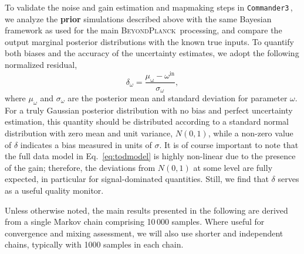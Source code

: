 \documentclass[twocolumn]{aa}%
\def\commanderthree{\texttt{Commander3}}
\newcommand{\BP}{\textsc{BeyondPlanck}}
\begin{document}
To validate the noise and gain estimation and mapmaking steps in
\commanderthree\,, we analyze the {\bf prior} simulations described
above with the same Bayesian framework as used for the main
\BP\ processing, and compare the output marginal posterior
distributions with the known true inputs. To quantify both biases and
the accuracy of the uncertainty estimates, we adopt the following
normalized residual,
\begin{equation}
\delta_\omega = \frac{\mu_{\mathrm{\omega}} - \omega^{\mathrm{in}}}{\sigma_{\omega}},
\end{equation}
where $\mu_{\omega}$ and $\sigma_{\omega}$ are the posterior mean and
standard deviation for parameter $\omega$. For a truly Gaussian
posterior distribution with no bias and perfect uncertainty
estimation, this quantity should be distributed according to a
standard normal distribution with zero mean and unit variance,
$N(0,1)$, while a non-zero value of $\delta$ indicates a bias measured
in units of $\sigma$. It is of course important to note that the full
data model in Eq.~\eqref{eq:todmodel} is highly non-linear due to the
presence of the gain; therefore, the deviations from $N(0,1)$ at some level 
are fully expected, in particular for signal-dominated
quantities. Still, we find that $\delta$ serves as a useful quality
monitor.

Unless otherwise noted, the main results presented in the following
are derived from a single Markov chain comprising 10\,000
samples. Where useful for convergence and mixing assessment, we will
also use shorter and independent chains, typically with 1000 samples
in each chain.
\end{document}
